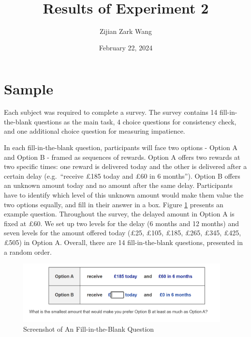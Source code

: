 \documentclass[
  12pt,
]{article}
\title{Results of Experiment 2}
\author{Zijian Zark Wang}
\date{February 22, 2024}
\begin{document}
\maketitle

\hypertarget{sample}{%
\section{Sample}\label{sample}}

Each subject was required to complete a survey. The survey contains 14
fill-in-the-blank questions as the main task, 4 choice questions for
consistency check, and one additional choice question for measuring
impatience.

In each fill-in-the-blank question, participants will face two options -
Option A and Option B - framed as sequences of rewards. Option A offers
two rewards at two specific times: one reward is delivered today and the
other is delivered after a certain delay (e.g.~``receive £185 today and
£60 in 6 months''). Option B offers an unknown amount today and no
amount after the same delay. Participants have to identify which level
of this unknown amount would make them value the two options equally,
and fill in their answer in a box. Figure \ref{fig:fill-blank-screen}
presents an example question. Throughout the survey, the delayed amount
in Option A is fixed at £60. We set up two levels for the delay (6
months and 12 months) and seven levels for the amount offered today
(£25, £105, £185, £265, £345, £425, £505) in Option A. Overall, there
are 14 fill-in-the-blank questions, presented in a random order.

\begin{figure}
  \vspace{16pt}
  \centering
  \includegraphics[width=0.96\textwidth]{figures/screenshot.png}
  \caption{Screenshot of An Fill-in-the-Blank Question}
  \label{fig:fill-blank-screen}
\end{figure}
\end{document}
